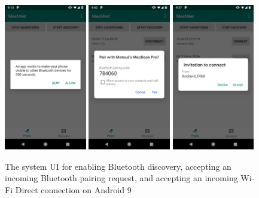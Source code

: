 \begin{figure}
    \centering
    \includegraphics[width=0.32\textwidth]{screens/dialog_bluetooth-discovery}
    \includegraphics[width=0.32\textwidth]{screens/dialog_bluetooth-pairing}
    \includegraphics[width=0.32\textwidth]{screens/dialog_wifi-direct}
    \caption{The system UI for enabling Bluetooth discovery, accepting an incoming Bluetooth pairing request, and accepting an incoming Wi-Fi Direct connection on Android 9}
    \label{system_ui}
\end{figure}

